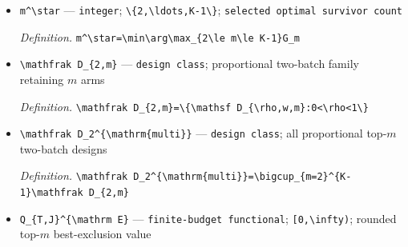 \documentclass{article}
\begin{document}
\begin{itemize}
  \par\smallskip\noindent\emph{Definition.} \texttt{G\_\allowbreak{}\{\textbackslash{}\allowbreak{}mathrm\{multi\}\allowbreak{}\}\allowbreak{}=\allowbreak{}\textbackslash{}\allowbreak{}max\_\allowbreak{}\{2\textbackslash{}\allowbreak{}le m\textbackslash{}\allowbreak{}le K-\allowbreak{}1\}\allowbreak{}G\_\allowbreak{}m}
  \item \texttt{m\textasciicircum{}\textbackslash{}\allowbreak{}star} --- \texttt{integer}; \texttt{\textbackslash{}\allowbreak{}\{2,\allowbreak{}\textbackslash{}\allowbreak{}ldots,\allowbreak{}K-\allowbreak{}1\textbackslash{}\allowbreak{}\}\allowbreak{}}; \texttt{selected optimal survivor count}
  \par\smallskip\noindent\emph{Definition.} \texttt{m\textasciicircum{}\textbackslash{}\allowbreak{}star=\allowbreak{}\textbackslash{}\allowbreak{}min\textbackslash{}\allowbreak{}arg\textbackslash{}\allowbreak{}max\_\allowbreak{}\{2\textbackslash{}\allowbreak{}le m\textbackslash{}\allowbreak{}le K-\allowbreak{}1\}\allowbreak{}G\_\allowbreak{}m}
  \item \texttt{\textbackslash{}\allowbreak{}mathfrak D\_\allowbreak{}\{2,\allowbreak{}m\}\allowbreak{}} --- \texttt{design class}; proportional two-batch family retaining \(m\) arms
  \par\smallskip\noindent\emph{Definition.} \texttt{\textbackslash{}\allowbreak{}mathfrak D\_\allowbreak{}\{2,\allowbreak{}m\}\allowbreak{}=\allowbreak{}\textbackslash{}\allowbreak{}\{\textbackslash{}\allowbreak{}mathsf D\_\allowbreak{}\{\textbackslash{}\allowbreak{}rho,\allowbreak{}w,\allowbreak{}m\}\allowbreak{}:\allowbreak{}0<\textbackslash{}\allowbreak{}rho<1\textbackslash{}\allowbreak{}\}\allowbreak{}}
  \item \texttt{\textbackslash{}\allowbreak{}mathfrak D\_\allowbreak{}2\textasciicircum{}\{\textbackslash{}\allowbreak{}mathrm\{multi\}\allowbreak{}\}\allowbreak{}} --- \texttt{design class}; all proportional top-\(m\) two-batch designs
  \par\smallskip\noindent\emph{Definition.} \texttt{\textbackslash{}\allowbreak{}mathfrak D\_\allowbreak{}2\textasciicircum{}\{\textbackslash{}\allowbreak{}mathrm\{multi\}\allowbreak{}\}\allowbreak{}=\allowbreak{}\textbackslash{}\allowbreak{}bigcup\_\allowbreak{}\{m=\allowbreak{}2\}\allowbreak{}\textasciicircum{}\{K-\allowbreak{}1\}\allowbreak{}\textbackslash{}\allowbreak{}mathfrak D\_\allowbreak{}\{2,\allowbreak{}m\}\allowbreak{}}
  \item \texttt{Q\_\allowbreak{}\{T,\allowbreak{}J\}\allowbreak{}\textasciicircum{}\{\textbackslash{}\allowbreak{}mathrm E\}\allowbreak{}} --- \texttt{finite-\allowbreak{}budget functional}; \texttt{[0,\allowbreak{}\textbackslash{}\allowbreak{}infty)}; rounded top-\(m\) best-exclusion value

\end{itemize}
\end{document}
